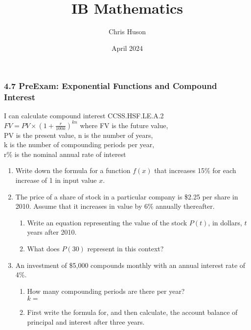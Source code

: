 \documentclass[12pt, twoside]{article}
\title{IB Mathematics}
\author{Chris Huson}
\date{April 2024} %
\begin{document}
\subsubsection*{4.7 PreExam: Exponential Functions and Compound Interest}
I can calculate compound interest \hfill CCSS.HSF.LE.A.2 \\[0.5cm]
$\displaystyle FV=PV \times \left(1+\frac{r}{100k} \right)^{kn}$
where FV is the future value,\\[0.25cm]
PV is the present value, n is the number of years, \\
 k is the number of compounding periods per year, \\
 r\% is the nominal annual rate of interest

\begin{enumerate}
\item Write down the formula for a function $f(x)$ that increases 15\% for each increase of 1 in input value $x$. \vspace{2cm}
\item The price of a share of stock in a particular company is \$2.25 per share in 2010. Assume that it increases in value by 6\% annually thereafter. 
\begin{enumerate}
    \item 	Write an equation representing the value of the stock $P(t)$, in dollars, $t$ years after 2010. \vspace{2cm}
    \item What does $P(30)$ represent in this context? \vspace{2cm}
\end{enumerate}

\item An investment of \$5,000 compounds monthly with an annual interest rate of 4\%.
\begin{enumerate}[itemsep=0.5cm]
    \item How many compounding periods are there per year? \\[0.25cm]
    $k=$
    \item First write the formula for, and then calculate, the account balance of principal and interest after three years.
\end{enumerate} \vspace{2cm}


\end{enumerate}
\end{document}
